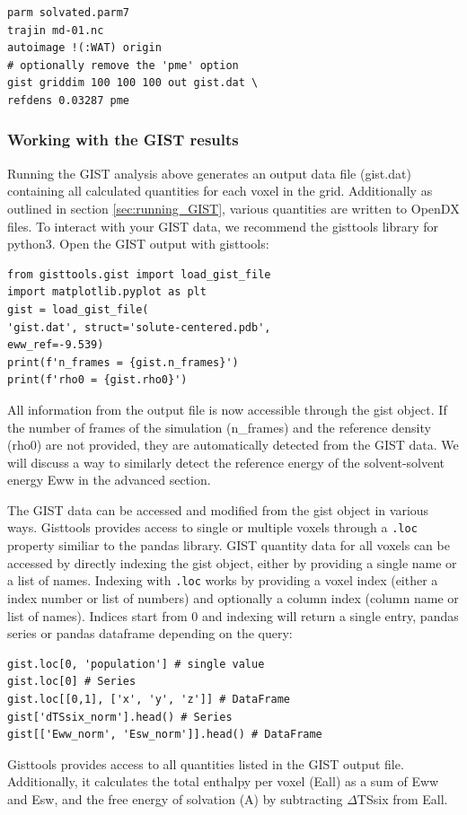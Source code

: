 \documentclass[9pt,tutorial]{livecoms}
\newcommand{\code}{\texttt}
\begin{document}
\begin{lstlisting}[style=cpptraj]
parm solvated.parm7
trajin md-01.nc
autoimage !(:WAT) origin
# optionally remove the 'pme' option
gist griddim 100 100 100 out gist.dat \
refdens 0.03287 pme
\end{lstlisting}
\subsubsection{Working with the GIST results}
Running the GIST analysis above generates an output data file (gist.dat) containing all calculated quantities for each voxel in the grid. 
Additionally as outlined in section \ref{sec:running_GIST}, various quantities are written to OpenDX files.
To interact with your GIST data, we recommend the gisttools library for python3. Open the GIST output with gisttools:
\begin{lstlisting}[style=python]
from gisttools.gist import load_gist_file
import matplotlib.pyplot as plt
gist = load_gist_file(
'gist.dat', struct='solute-centered.pdb',  
eww_ref=-9.539)
print(f'n_frames = {gist.n_frames}')
print(f'rho0 = {gist.rho0}')
\end{lstlisting}
All information from the output file is now accessible through the gist object. 
If the number of frames of the simulation (n\_frames) and the reference density (rho0) are not provided, they are automatically detected from the GIST data. 
We will discuss a way to similarly detect the reference energy of the solvent-solvent energy Eww in the advanced section.

The GIST data can be accessed and modified from the gist object in various ways.
Gisttools provides access to single or multiple voxels through a \code{.loc} property similiar to the pandas library. 
GIST quantity data for all voxels can be accessed by directly indexing the gist object, either by providing a single name or a list of names.
Indexing with \code{.loc} works by providing a voxel index (either a index number or list of numbers) and optionally a column index (column name or list of names). Indices start from 0 and indexing will return a single entry, pandas series or pandas dataframe depending on the query:
\begin{lstlisting}[style=python]
gist.loc[0, 'population'] # single value
gist.loc[0] # Series
gist.loc[[0,1], ['x', 'y', 'z']] # DataFrame
gist['dTSsix_norm'].head() # Series
gist[['Eww_norm', 'Esw_norm']].head() # DataFrame
\end{lstlisting}
Gisttools provides access to all quantities listed in the GIST output file.
Additionally, it calculates the total enthalpy per voxel (Eall) as a sum of Eww and Esw, and the free energy of solvation (A) by subtracting $\Delta$TSsix from Eall.
\end{document}
